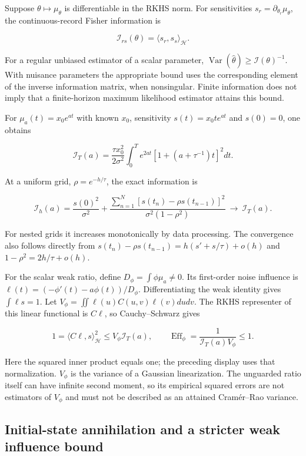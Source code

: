 \documentclass[
  11pt,
]{article}
\begin{document}
Suppose \(\theta\mapsto\mu_\theta\) is differentiable in the RKHS norm.
For sensitivities \(s_r=\partial_{\theta_r}\mu_\theta\), the
continuous-record Fisher information is

\[
\mathcal I_{rs}(\theta)=\langle s_r,s_s\rangle_{\mathcal H}.
\]

For a regular unbiased estimator of a scalar parameter,
\(\operatorname{Var}(\widehat\theta)\geq\mathcal I(\theta)^{-1}\). With
nuisance parameters the appropriate bound uses the corresponding element
of the inverse information matrix, when nonsingular. Finite information
does not imply that a finite-horizon maximum likelihood estimator
attains this bound.

For \(\mu_a(t)=x_0e^{at}\) with known \(x_0\), sensitivity
\(s(t)=x_0te^{at}\) and \(s(0)=0\), one obtains

\[
\mathcal I_T(a)=\frac{\tau x_0^2}{2\sigma^2}\int_0^T e^{2at}\left[1+(a+\tau^{-1})t\right]^2dt.
\]

At a uniform grid, \(\rho=e^{-h/\tau}\), the exact information is

\[
\mathcal I_h(a)=\frac{s(0)^2}{\sigma^2}+\frac{\sum_{n=1}^N[s(t_n)-\rho s(t_{n-1})]^2}{\sigma^2(1-\rho^2)}\ \longrightarrow\ \mathcal I_T(a).
\]

For nested grids it increases monotonically by data processing. The
convergence also follows directly from
\(s(t_n)-\rho s(t_{n-1})=h(s'+s/\tau)+o(h)\) and
\(1-\rho^2=2h/\tau+o(h)\).

For the scalar weak ratio, define \(D_\phi=\int\phi\mu_a\ne0\). Its
first-order noise influence is \(\ell(t)=(-\phi'(t)-a\phi(t))/D_\phi\).
Differentiating the weak identity gives \(\int\ell s=1\). Let
\(V_\phi=\iint\ell(u)C(u,v)\ell(v)dudv\). The RKHS representer of this
linear functional is \(C\ell\), so Cauchy--Schwarz gives

\[
1=\langle C\ell,s\rangle_{\mathcal H}^2\leq V_\phi\mathcal I_T(a),\qquad \operatorname{Eff}_\phi=\frac1{\mathcal I_T(a)V_\phi}\leq1.
\]

Here the squared inner product equals one; the preceding display uses
that normalization. \(V_\phi\) is the variance of a Gaussian
linearization. The unguarded ratio itself can have infinite second
moment, so its empirical squared errors are not estimators of \(V_\phi\)
and must not be described as an attained Cramér--Rao variance.

\subsection{Initial-state annihilation and a stricter weak influence
bound}\label{initial-state-annihilation-and-a-stricter-weak-influence-bound}
\end{document}
